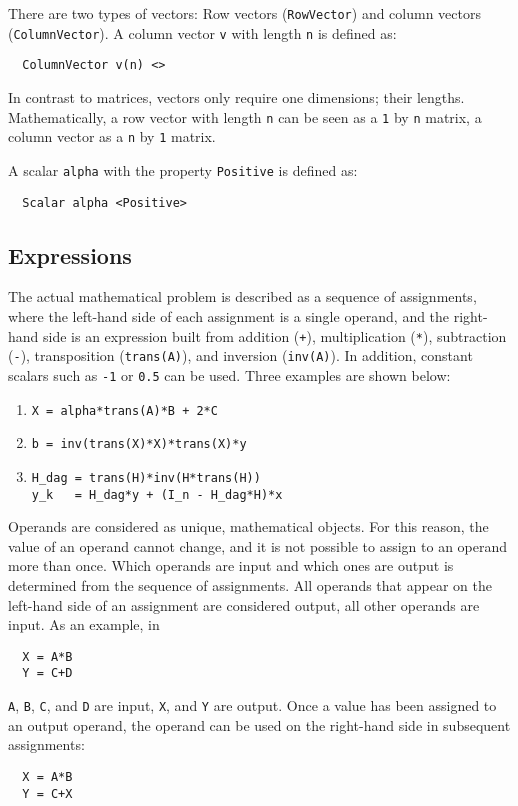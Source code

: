 \documentclass[
  12pt,
  a4paper,
]{scrartcl}
\begin{document}
There are two types of vectors: Row vectors (\texttt{RowVector}) and column vectors (\texttt{Column\-Vector}). A column vector \texttt{v} with length \texttt{n} is defined as:
\begin{verbatim}
  ColumnVector v(n) <>
\end{verbatim}
In contrast to matrices, vectors only require one dimensions; their lengths. Mathematically, a row vector with length \texttt{n} can be seen as a \texttt{1} by \texttt{n} matrix, a column vector as a \texttt{n} by \texttt{1} matrix.

A scalar \texttt{alpha} with the property \texttt{Positive} is defined as:
\begin{verbatim}
  Scalar alpha <Positive>
\end{verbatim}

\subsection{Expressions}

The actual mathematical problem is described as a sequence of assignments, where the left-hand side of each assignment is a single operand, and the right-hand side is an expression built from addition (\texttt{+}), multiplication (\texttt{*}), subtraction (\texttt{-}), transposition (\texttt{trans(A)}), and inversion (\texttt{inv(A)}). In addition, constant scalars such as \texttt{-1} or \texttt{0.5} can be used. Three examples are shown below:

\begin{enumerate}
\item
\begin{verbatim}
X = alpha*trans(A)*B + 2*C
\end{verbatim}

\item
\begin{verbatim}
b = inv(trans(X)*X)*trans(X)*y
\end{verbatim}

\item
\begin{verbatim}
H_dag = trans(H)*inv(H*trans(H))
y_k   = H_dag*y + (I_n - H_dag*H)*x
\end{verbatim}
\end{enumerate}

Operands are considered as unique, mathematical objects. For this reason, the value of an operand cannot change, and it is not possible to assign to an operand more than once.
Which operands are input and which ones are output is determined from the sequence of assignments. All operands that appear on the left-hand side of an assignment are considered output, all other operands are input. As an example, in
\begin{verbatim}
  X = A*B
  Y = C+D
\end{verbatim}
\texttt{A}, \texttt{B}, \texttt{C}, and \texttt{D} are input, \texttt{X}, and \texttt{Y} are output.
Once a value has been assigned to an output operand, the operand can be used on the right-hand side in subsequent assignments:
\begin{verbatim}
  X = A*B
  Y = C+X
\end{verbatim}
\end{document}
